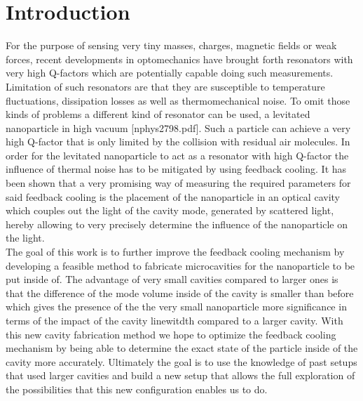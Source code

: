\chapter{Introduction}
For the purpose of sensing very tiny masses, charges, magnetic fields or weak forces, recent developments in optomechanics have brought forth resonators with very high Q-factors which are potentially capable doing such measurements. Limitation of such resonators are that they are susceptible to temperature fluctuations, dissipation losses as well as thermomechanical noise. To omit those kinds of problems a different kind of resonator can be used, a levitated nanoparticle in high vacuum [nphys2798.pdf]. Such a particle can achieve a very high Q-factor that is only limited by the collision with residual air molecules. In order for the levitated nanoparticle to act as a resonator with high Q-factor the influence of thermal noise has to be mitigated by using feedback cooling. It has been shown that a very promising way of measuring the required parameters for said feedback cooling is the placement of the nanoparticle in an optical cavity which couples out the light of the cavity mode, generated by scattered light, hereby allowing to very precisely determine the influence of the nanoparticle on the light.\\
The goal of this work is to further improve the feedback cooling mechanism by developing a feasible method to fabricate microcavities for the nanoparticle to be put inside of. The advantage of very small cavities compared to larger ones is that the difference of the mode volume inside of the cavity is smaller than before which gives the presence of the the very small nanoparticle more significance in terms of the impact of the cavity linewitdth compared to a larger cavity. With this new cavity fabrication method we hope to optimize the feedback cooling mechanism by being able to determine the exact state of the particle inside of the cavity more accurately. Ultimately the goal is to use the knowledge of past setups that used larger cavities and build a new setup that allows the full exploration of the possibilities that this new configuration enables us to do.








